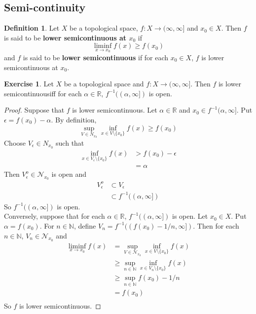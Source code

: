 \documentclass[12pt]{amsart}
\theoremstyle{definition}
\newtheorem{defn}[definition]{Definition}
\newtheorem{ex}[definition]{Exercise}
\newcommand{\al}{\alpha}
\newcommand{\ep}{\epsilon}
\newcommand{\N}{\mathbb{N}}
\newcommand{\R}{\mathbb{R}}
\newcommand{\MN}{\mathcal{N}}
\newcommand{\tbf}[1]{\textbf{#1}}
\newcommand{\Ru}{(\infty, \infty]}
\newcommand{\lsc}{lower semicontinuous}
\DeclareMathOperator*{\0}{\mbf{0}}
\DeclareMathOperator*{\1}{\mbf{1}}
\newcommand{\lex}[1]{\label{ex:#1}}
\newcommand{\ld}[1]{\label{defn:#1}}
\begin{document}
	
	
	
	
	
	
	
	
	
	
	
	
	
	
	
	
	
	
	\newpage
	\subsection{Semi-continuity}
	
	\begin{defn} \ld{}
	Let $X$ be a topological space, $f: X \rightarrow \Ru$ and $x_0 \in X$. Then $f$ is said to be \tbf{lower semicontinuous at $x_0$} if $$\liminf_{x \rightarrow x_0}f(x) \geq f(x_0)$$ and $f$ is said to be \tbf{lower semicontinuous} if for each $x_0 \in X$, $f$ is lower semicontinuous at $x_0$. 
	\end{defn}
	
	\begin{ex} \lex{}
	Let $X$ be a topological space and $f: X \rightarrow \Ru$. Then $f$ is \lsc iff for each $\al \in \R$, $f^{-1}((\al, \infty])$ is open. 
	\end{ex}
	
	\begin{proof}
	Suppose that $f$ is \lsc. Let $\al \in \R$ and $x_0 \in f^{-1}(\al, \infty]$. Put $\ep = f(x_0) - \al$. By definition, $$\sup_{V \in N_{x_0}} \inf_{x \in V \setminus \{x_0\}} f(x) \geq f(x_0)$$ Choose $V_{\ep} \in N_{x_0}$ such that 
	\begin{align*}
	\inf_{x \in V_{\ep} \setminus \{x_0\}} f(x)  
	&> f(x_0) - \ep \\
	&= \al
\end{align*}
Then $V_{\ep}^o \in \MN_{x_0}$ is open and 
	\begin{align*}
		V_{\ep}^o 
		& \subset V_{\ep} \\
		&\subset f^{-1}((\al, \infty])
	\end{align*} 
	So $f^{-1}((\al, \infty])$ is open. \\
	Conversely, suppose that for each $\al \in \R$, $f^{-1}((\al, \infty])$ is open. Let $x_0 \in X$. Put $\al = f(x_0)$. For $n \in \N$, define $V_n = f^{-1}((f(x_0)-1/n, \infty]) $. Then for each $n \in \N$, $V_n \in \MN_{x_0}$ and 
	\begin{align*}
	\liminf_{x \rightarrow x_0} f(x) 
	&= \sup_{V \in \MN_{x_0}} \inf_{x \in V \setminus \{x_0\}} f(x) \\
	& \geq \sup_{n \in \N} \inf_{x \in V_n \setminus \{x_0\}} f(x) \\
	& \geq \sup_{n \in \N} f(x_0)-1/n \\
	&= f(x_0) \\
	\end{align*}
	So $f$ is \lsc.
	\end{proof}
\end{document}
